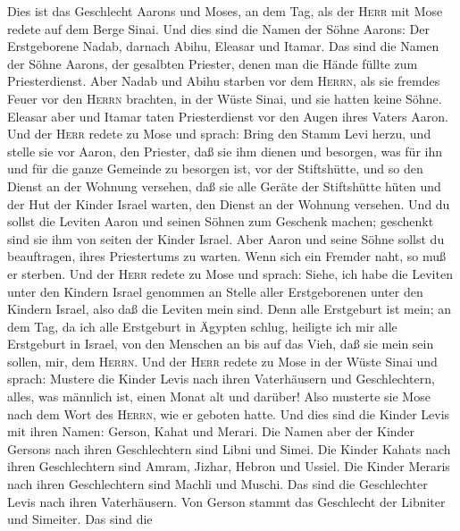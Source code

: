  Dies ist das Geschlecht Aarons und Moses, an dem Tag, als
der \textsc{Herr} mit Mose redete auf dem Berge Sinai. 
Und dies sind die Namen der Söhne Aarons: Der Erstgeborene Nadab,
darnach Abihu, Eleasar und Itamar.  Das sind die Namen der
Söhne Aarons, der gesalbten Priester, denen man die Hände füllte zum
Priesterdienst.  Aber Nadab und Abihu starben vor dem
\textsc{Herrn}, als sie fremdes Feuer vor den \textsc{Herrn} brachten,
in der Wüste Sinai, und sie hatten keine Söhne. Eleasar aber und Itamar
taten Priesterdienst vor den Augen ihres Vaters Aaron. 
Und der \textsc{Herr} redete zu Mose und sprach:  Bring
den Stamm Levi herzu, und stelle sie vor Aaron, den Priester, daß sie
ihm dienen und besorgen,  was für ihn und für die ganze
Gemeinde zu besorgen ist, vor der Stiftshütte, und so den Dienst an der
Wohnung versehen,  daß sie alle Geräte der Stiftshütte
hüten und der Hut der Kinder Israel warten, den Dienst an der Wohnung
versehen.  Und du sollst die Leviten Aaron und seinen
Söhnen zum Geschenk machen; geschenkt sind sie ihm von seiten der Kinder
Israel.  Aber Aaron und seine Söhne sollst du
beauftragen, ihres Priestertums zu warten. Wenn sich ein Fremder naht,
so muß er sterben.  Und der \textsc{Herr} redete zu Mose
und sprach:  Siehe, ich habe die Leviten unter den
Kindern Israel genommen an Stelle aller Erstgeborenen unter den Kindern
Israel, also daß die Leviten mein sind.  Denn alle
Erstgeburt ist mein; an dem Tag, da ich alle Erstgeburt in Ägypten
schlug, heiligte ich mir alle Erstgeburt in Israel, von den Menschen an
bis auf das Vieh, daß sie mein sein sollen, mir, dem \textsc{Herrn}.
 Und der \textsc{Herr} redete zu Mose in der Wüste Sinai
und sprach:  Mustere die Kinder Levis nach ihren
Vaterhäusern und Geschlechtern, alles, was männlich ist, einen Monat alt
und darüber!  Also musterte sie Mose nach dem Wort des
\textsc{Herrn}, wie er geboten hatte.  Und dies sind die
Kinder Levis mit ihren Namen: Gerson, Kahat und Merari. 
Die Namen aber der Kinder Gersons nach ihren Geschlechtern sind Libni
und Simei.  Die Kinder Kahats nach ihren Geschlechtern
sind Amram, Jizhar, Hebron und Ussiel.  Die Kinder
Meraris nach ihren Geschlechtern sind Machli und Muschi. Das sind die
Geschlechter Levis nach ihren Vaterhäusern.  Von Gerson
stammt das Geschlecht der Libniter und Simeiter. Das sind die
